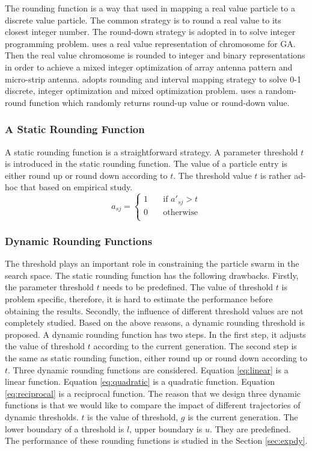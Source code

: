 The rounding function is a way that used in mapping a real value particle to a discrete value particle.
The common strategy is to round a real value to its closest integer number.
The round-down strategy is adopted in \cite{1004478} to solve integer programming problem. 
\cite{4120263} uses a real value representation of chromosome for GA. 
Then the real value chromosome is rounded to integer and binary representations in order to 
achieve a mixed integer optimization of array antenna pattern and micro-strip antenna. 
\cite{liu2013discrete} adopts rounding and interval mapping strategy to solve 0-1 discrete,
integer optimization and mixed optimization problem. 
\cite{Anghinolfi200973} uses a random-round function which randomly returns round-up value or round-down value.

\subsubsection{A Static Rounding Function}

A static rounding function is a straightforward strategy. A parameter threshold $t$ is introduced in the static rounding function.
The value of a particle entry is either round up or round down according to $t$. 
The threshold value $t$ is rather ad-hoc that based on empirical study.
 \begin{equation}
 	\label{eq:1}
 	a_{sj} = 
 	\begin{cases}
 		1 & \quad \text{if } a'_{sj} > t \\
 		0 & \quad \text{otherwise} \\
 	\end{cases}
 \end{equation}

 
\subsubsection{Dynamic Rounding Functions}
\label{sec:dynamic}
The threshold plays an important role in constraining the particle swarm in the search space.
The static rounding function has the following drawbacks. Firstly, the parameter threshold $t$ needs to be predefined. 
The value of threshold $t$ is problem specific, therefore, it is hard to estimate the performance before obtaining the results.
Secondly, the influence of different threshold values are not completely studied. Based on the above reasons, a dynamic rounding threshold
is proposed. A dynamic rounding function has two steps. In the first step, it adjusts the value of threshold $t$ according to the current generation. 
The second step is the same as static rounding function, either round up or round down according to $t$. Three dynamic rounding functions are considered. Equation \ref{eq:linear} is a linear function.
Equation \ref{eq:quadratic} is a quadratic function. Equation \ref{eq:reciprocal} is a reciprocal function. The reason that we design three 
dynamic functions is that we would like to compare the impact of different trajectories of dynamic thresholds.
$t$ is the value of threshold, $g$ is the current generation. The lower boundary of a threshold is $l$, upper boundary is $u$.
They are predefined.
The performance of these rounding functions is studied in the Section \ref{sec:expdy}.


